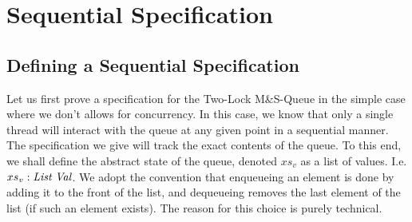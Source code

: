 \documentclass[a4paper, 11pt]{report}
\newcommand{\acquire}{\operatorname{acquire}}
\newcommand{\release}{\operatorname{release}}
\newcommand{\enqueue}{\operatorname{enqueue}}
\newcommand{\dequeue}{\operatorname{dequeue}}
\newcommand{\tlmsq}{Two-Lock M\&S-Queue\xspace}
\begin{document}



\chapter{Sequential Specification}
\label{ch:TLMSQSEQ}

\section{Defining a Sequential Specification}
\label{TLMSQSEQ:section:sequential-spec}

Let us first prove a specification for the \tlmsq in the simple case where we don't allows for concurrency. In this case, we know that only a single thread will interact with the queue at any given point in a sequential manner. The specification we give will track the exact contents of the queue. To this end, we shall define the abstract state of the queue, denoted $xs_v$ as a list of \heaplang values. I.e. $xs_v : \List \ \Val$. We adopt the convention that enqueueing an element is done by adding it to the front of the list, and dequeueing removes the last element of the list (if such an element exists). The reason for this choice is purely technical.
\end{document}
